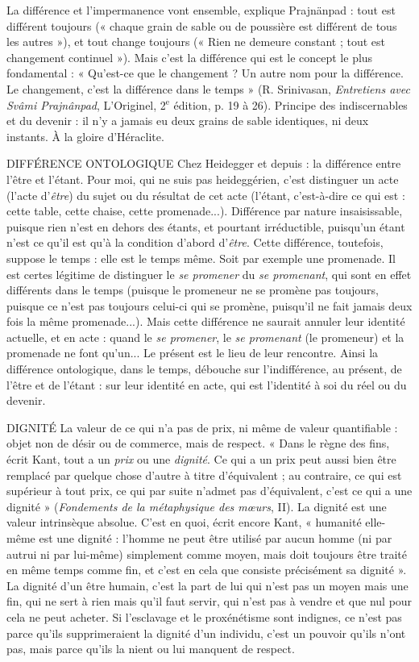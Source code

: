 La différence et l’impermanence vont ensemble, explique Prajnänpad : tout
est différent toujours (« chaque grain de sable ou de poussière est différent de
tous les autres »), et tout change toujours (« Rien ne demeure constant ; tout
est changement continuel »). Mais c’est la différence qui est le concept le plus
fondamental : « Qu'est-ce que le changement ? Un autre nom pour la différence.
Le changement, c’est la différence dans le temps » (R. Srinivasan, {\it Entretiens
avec Svâmi Prajnânpad}, L'Originel, 2$^\text{e}$ édition, p. 19 à 26). Principe des
indiscernables et du devenir : il n’y a jamais eu deux grains de sable identiques,
ni deux instants. À la gloire d’Héraclite.

DIFFÉRENCE ONTOLOGIQUE Chez Heidegger et depuis : la différence
entre l’être et l’étant. Pour moi, qui ne
suis pas heideggérien, c’est distinguer un acte (l'acte d’{\it être}) du sujet ou du
résultat de cet acte (l’étant, c’est-à-dire ce qui est : cette table, cette chaise,
cette promenade...). Différence par nature insaisissable, puisque rien n’est en
dehors des étants, et pourtant irréductible, puisqu’un étant n’est ce qu’il est
qu'à la condition d’abord d’{\it être}. Cette différence, toutefois, suppose le
temps : elle est le temps même. Soit par exemple une promenade. Il est
certes légitime de distinguer le {\it se promener} du {\it se promenant}, qui sont en effet
différents dans le temps (puisque le promeneur ne se promène pas toujours,
puisque ce n’est pas toujours celui-ci qui se promène, puisqu'il ne fait jamais
deux fois la même promenade...). Mais cette différence ne saurait annuler
leur identité actuelle, et en acte : quand le {\it se promener}, le {\it se promenant} (le
promeneur) et la promenade ne font qu’un... Le présent est le lieu de leur
rencontre. Ainsi la différence ontologique, dans le temps, débouche sur l’indifférence,
au présent, de l’être et de l’étant : sur leur identité en acte, qui est
l'identité à soi du réel ou du devenir.

DIGNITÉ La valeur de ce qui n’a pas de prix, ni même de valeur quantifiable :
objet non de désir ou de commerce, mais de respect.
« Dans le règne des fins, écrit Kant, tout a un {\it prix} ou une {\it dignité}. Ce qui a
un prix peut aussi bien être remplacé par quelque chose d’autre à titre
d’équivalent ; au contraire, ce qui est supérieur à tout prix, ce qui par suite
n’admet pas d’équivalent, c’est ce qui a une dignité » ({\it Fondements de la métaphysique
des mœurs}, II). La dignité est une valeur intrinsèque absolue. C’est en
quoi, écrit encore Kant, « humanité elle-même est une dignité : l'homme ne
peut être utilisé par aucun homme (ni par autrui ni par lui-même) simplement
comme moyen, mais doit toujours être traité en même temps comme fin, et
c’est en cela que consiste précisément sa dignité ». La dignité d’un être humain,
c’est la part de lui qui n’est pas un moyen mais une fin, qui ne sert à rien mais
qu'il faut servir, qui n’est pas à vendre et que nul pour cela ne peut acheter. Si
l'esclavage et le proxénétisme sont indignes, ce n’est pas parce qu’ils supprimeraient
la dignité d’un individu, c’est un pouvoir qu’ils n’ont pas, mais parce
qu’ils la nient ou lui manquent de respect.

